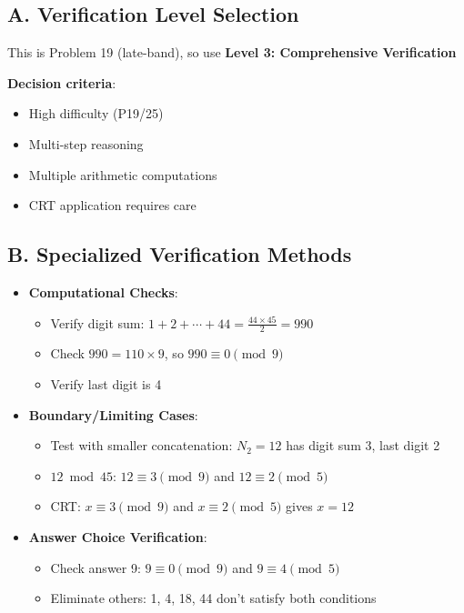 \documentclass[11pt]{article}
\begin{document}
\begin{verificationbox}
\subsection*{A. Verification Level Selection}
This is Problem 19 (late-band), so use \textbf{Level 3: Comprehensive Verification}

\textbf{Decision criteria}:
\begin{itemize}
    \item High difficulty (P19/25)
    \item Multi-step reasoning
    \item Multiple arithmetic computations
    \item CRT application requires care
\end{itemize}

\subsection*{B. Specialized Verification Methods}
\begin{itemize}[leftmargin=*]
    \item \textbf{Computational Checks}:
    \begin{itemize}
        \item Verify digit sum: $1+2+\cdots+44 = \frac{44 \times 45}{2} = 990$
        \item Check $990 = 110 \times 9$, so $990 \equiv 0 \pmod{9}$ \checkmark
        \item Verify last digit is 4 \checkmark
    \end{itemize}
    
    \item \textbf{Boundary/Limiting Cases}:
    \begin{itemize}
        \item Test with smaller concatenation: $N_2 = 12$ has digit sum 3, last digit 2
        \item $12 \bmod 45$: $12 \equiv 3 \pmod{9}$ and $12 \equiv 2 \pmod{5}$
        \item CRT: $x \equiv 3 \pmod{9}$ and $x \equiv 2 \pmod{5}$ gives $x = 12$ \checkmark
    \end{itemize}
    
    \item \textbf{Answer Choice Verification}:
    \begin{itemize}
        \item Check answer 9: $9 \equiv 0 \pmod{9}$ \checkmark and $9 \equiv 4 \pmod{5}$ \checkmark
        \item Eliminate others: 1, 4, 18, 44 don't satisfy both conditions
    \end{itemize}
    

\end{itemize}
\end{verificationbox}
\end{document}

